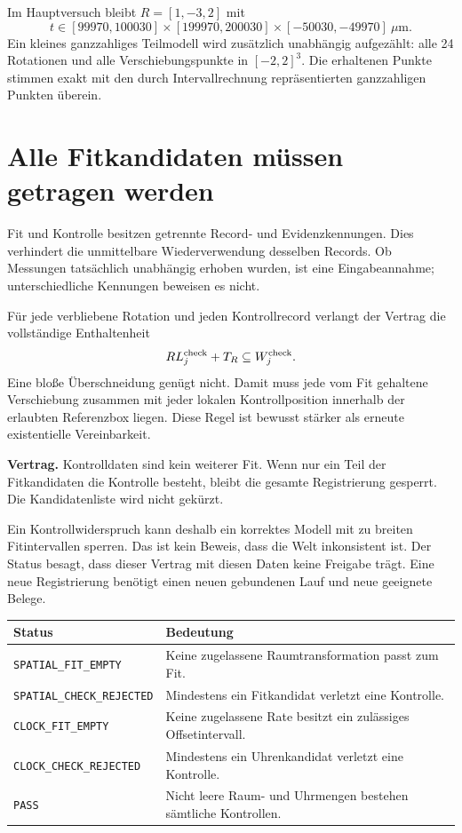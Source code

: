 \documentclass[11pt,a4paper]{article}
\newcommand{\contract}[1]{\vspace{3pt}\noindent\colorbox{pale}{\parbox{\dimexpr\linewidth-2\fboxsep}{\textbf{Vertrag.} #1}}\vspace{5pt}}
\newcommand{\nextsection}[2]{\clearpage{\color{accent}\small\textsf{#1}}\section{#2}}
\begin{document}
Im Hauptversuch bleibt $R=[1,-3,2]$ mit
\[
 t\in[99970,100030]\times[199970,200030]
 \times[-50030,-49970]\ \mu\mathrm m.
\]
Ein kleines ganzzahliges Teilmodell wird zusätzlich unabhängig
aufgezählt: alle 24 Rotationen und alle Verschiebungspunkte in
$[-2,2]^3$. Die erhaltenen Punkte stimmen exakt mit den durch
Intervallrechnung repräsentierten ganzzahligen Punkten überein.

\nextsection{92 / SEPARATE KONTROLLE}{Alle Fitkandidaten müssen getragen werden}
Fit und Kontrolle besitzen getrennte Record- und Evidenzkennungen.
Dies verhindert die unmittelbare Wiederverwendung desselben
Records. Ob Messungen tatsächlich unabhängig erhoben wurden,
ist eine Eingabeannahme; unterschiedliche Kennungen beweisen es nicht.

Für jede verbliebene Rotation und jeden Kontrollrecord verlangt
der Vertrag die vollständige Enthaltenheit
\[
 R L_j^{\rm check}+T_R\subseteq W_j^{\rm check}.
\]
Eine bloße Überschneidung genügt nicht. Damit muss jede vom Fit
gehaltene Verschiebung zusammen mit jeder lokalen Kontrollposition
innerhalb der erlaubten Referenzbox liegen. Diese Regel ist
bewusst stärker als erneute existentielle Vereinbarkeit.

\contract{Kontrolldaten sind kein weiterer Fit. Wenn nur ein Teil
der Fitkandidaten die Kontrolle besteht, bleibt die gesamte
Registrierung gesperrt. Die Kandidatenliste wird nicht gekürzt.}

Ein Kontrollwiderspruch kann deshalb ein korrektes Modell mit zu
breiten Fitintervallen sperren. Das ist kein Beweis, dass die Welt
inkonsistent ist. Der Status besagt, dass dieser Vertrag mit diesen
Daten keine Freigabe trägt. Eine neue Registrierung benötigt einen
neuen gebundenen Lauf und neue geeignete Belege.

\begin{tabularx}{\linewidth}{@{}lY@{}}\toprule
Status & Bedeutung\\\midrule
\texttt{SPATIAL\_FIT\_EMPTY} & Keine zugelassene Raumtransformation passt zum Fit.\\
\texttt{SPATIAL\_CHECK\_REJECTED} & Mindestens ein Fitkandidat verletzt eine Kontrolle.\\
\texttt{CLOCK\_FIT\_EMPTY} & Keine zugelassene Rate besitzt ein zulässiges Offsetintervall.\\
\texttt{CLOCK\_CHECK\_REJECTED} & Mindestens ein Uhrenkandidat verletzt eine Kontrolle.\\
\texttt{PASS} & Nicht leere Raum- und Uhrmengen bestehen sämtliche Kontrollen.\\\bottomrule
\end{tabularx}
\end{document}
